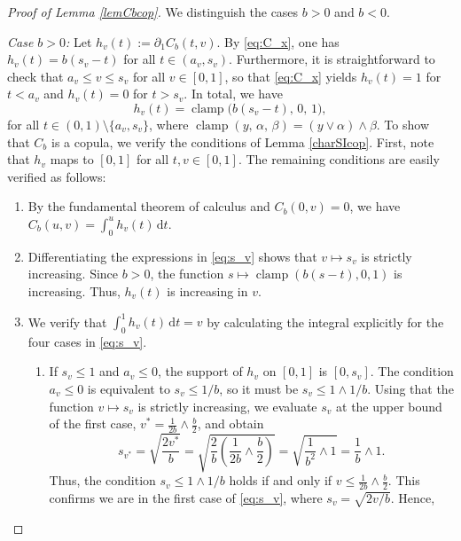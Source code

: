 \documentclass{article}
\theoremstyle{plain}
\theoremstyle{definition}
\newcommand{\de}{\mathrm{\,d}}
\begin{document}
\begin{proof}[Proof of Lemma \ref{lemCbcop}]
We distinguish the cases \(b>0\) and \(b<0\).

\emph{Case \(b>0\):}
Let \(h_v(t) := \partial_1 C_b(t,v)\). 
By \eqref{eq:C_x}, one has \(h_v(t) = b(s_v - t)\) for all \(t\in (a_v, s_v)\).
Furthermore, it is straightforward to check that $a_v \le v \le s_v$ for all \(v\in [0,1]\), so that \eqref{eq:C_x} yields $h_v(t) = 1$ for $t < a_v$ and $h_v(t) = 0$ for $t > s_v$. In total, we have
\begin{equation}\label{defhvhv}
    h_v(t) = \operatorname{clamp}\bigl(b(s_v-t),\, 0,\, 1\bigr),
\end{equation}
for all \(t\in (0,1)\setminus\{a_v,s_v\}\), where \(\operatorname{clamp}(y,\,\alpha,\,\beta) = (y \vee \alpha) \wedge \beta\).
To show that \(C_b\) is a copula, we verify the conditions of Lemma \ref{charSIcop}.
First, note that \(h_v\) maps to \([0,1]\) for all \(t,v\in [0,1]\).
The remaining conditions are easily verified as follows:
\begin{enumerate}[label=(\roman*), font=\upshape]
    \item By the fundamental theorem of calculus and \(C_b(0,v)=0\), we have \(C_b(u,v) = \int_0^u h_v(t) \de t\).
    \item Differentiating the expressions in \eqref{eq:s_v} shows that \(v \mapsto s_v\) is strictly increasing. Since \(b>0\), the function \(s \mapsto \operatorname{clamp}(b(s-t), 0, 1)\) is increasing. Thus, \(h_v(t)\) is increasing in \(v\).
    \item We verify that \(\int_0^1 h_v(t) \de t = v\) by calculating the integral explicitly for the four cases in \eqref{eq:s_v}.
    \begin{enumerate}[label=\arabic*., font=\upshape]
        \item If \(s_v \le 1\) and \(a_v \le 0\), the support of \(h_v\) on \([0,1]\) is \([0, s_v]\). The condition \(a_v \le 0\) is equivalent to \(s_v \le 1/b\), so it must be \(s_v \le 1 \wedge 1/b\).
        Using that the function \(v \mapsto s_v\) is strictly increasing, we evaluate \(s_v\) at the upper bound of the first case, \(v^* = \frac{1}{2b} \wedge \frac{b}{2}\), and obtain
        \[
            s_{v^*} = \sqrt{\frac{2v^*}{b}} = \sqrt{\frac{2}{b} \left(\frac{1}{2b} \wedge \frac{b}{2}\right)} = \sqrt{\frac{1}{b^2} \wedge 1} = \frac{1}{b} \wedge 1.
        \]
        Thus, the condition \(s_v \le 1 \wedge 1/b\) holds if and only if \(v \le \frac{1}{2b} \wedge \frac{b}{2}\). This confirms we are in the first case of \eqref{eq:s_v}, where \(s_v = \sqrt{2v/b}\). Hence,

\end{enumerate}
\end{enumerate}
\end{proof}
\end{document}

